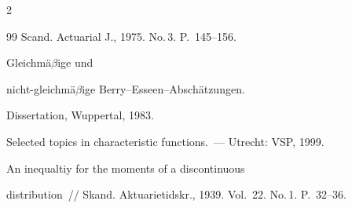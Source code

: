 \begin{multicols}{2}
{{\begin{thebibliography}{99}
Scand. Actuarial J., 1975. No.\,3. P.~145--156.





Gleichm{\"a}$\beta$ige und

nicht-gleichm{\"a}$\beta$ige Berry--Esseen--Absch{\"a}tzungen.

Dissertation, Wuppertal, 1983.



\label{end\stat}





Selected topics in characteristic functions.~--- Utrecht: VSP, 1999.





An inequaltiy for the moments of a discontinuous

distribution~// Skand. Aktuarietidskr., 1939. Vol.~22. No.\,1. P.~32--36.





 \end{thebibliography}

}

}

\end{multicols}

